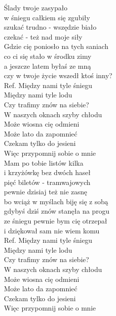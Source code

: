 \begin{flushleft}
Ślady twoje zasypało \tab{}\\
w śniegu całkiem się zgubiły \tab{}\\
szukać trudno - wszędzie biało \tab{}\\
czekać - też nad moje siły\tab{} \\
Gdzie cię poniosło na tych saniach \\
co ci się stało w środku zimy \tab{}\\
a jeszcze latem byłaś ze mną \tab{}\\
czy w twoje życie wszedł ktoś inny? \\
\vskip 3mm
Ref. Między nami tyle śniegu \tab{} \\
\hspace{0.9cm}Między nami tyle lodu \tab{}\\
\hspace{0.9cm}Czy trafimy znów na siebie? \\
\hspace{0.9cm}W naszych oknach szyby chłodu\\
\hspace{0.9cm}Może wiosna cię odmieni \tab{}\\
\hspace{0.9cm}Może lato da zapomnieć \tab{}\\
\hspace{0.9cm}Czekam tylko do jesieni \tab{}\\
\hspace{0.9cm}Więc przypomnij sobie o mnie  \\
\vskip 3mm
Mam po tobie listów kilka \\
i krzyżówkę bez dwóch haseł \\
pięć biletów - tramwajowych \\
pewnie dzisiaj też nie zasnę \\
bo wciąż w myślach biję się z sobą \\
gdybyś dziś znów stanęła na progu \\
ze śniegu pewnie bym cię otrzepał \\
i dziękował sam nie wiem komu \\
\vskip 3mm
Ref. Między nami tyle śniegu \\
\hspace{0.9cm}Między nami tyle lodu \\
\hspace{0.9cm}Czy trafimy znów na siebie? \\
\hspace{0.9cm}W naszych oknach szyby chłodu \\
\hspace{0.9cm}Może wiosna cię odmieni \\
\hspace{0.9cm}Może lato da zapomnieć \\
\hspace{0.9cm}Czekam tylko do jesieni \\
\hspace{0.9cm}Więc przypomnij sobie o mnie \\
\end{flushleft}
\clearpage
